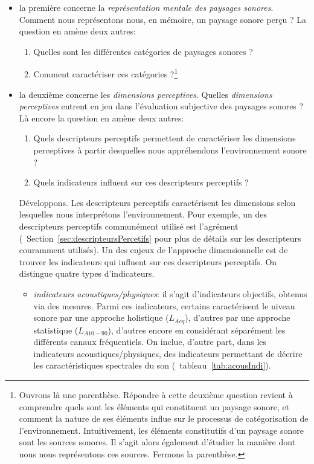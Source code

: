 \begin{itemize}
\item la première concerne la \emph{représentation mentale des paysages sonores}. Comment nous représentons nous, en mémoire, un paysage sonore perçu ? La question en amène deux autres:

\begin{enumerate}
\item Quelles sont les différentes catégories de paysages sonores ?
\item Comment caractériser ces catégories ?\footnote{Ouvrons là une parenthèse. Répondre à cette deuxième question revient à comprendre quels sont les éléments qui constituent un paysage sonore, et comment la nature de ses éléments influe sur le processus de catégorisation de l'environnement. Intuitivement, les éléments constitutifs d'un paysage sonore sont les sources sonores. Il s'agit alors également d'étudier la manière dont nous nous représentons ces sources. Fermons la parenthèse.}
\end{enumerate}

\item la deuxième concerne les \emph{dimensions perceptives}.  Quelles \emph{dimensions perceptives} entrent en jeu dans l'évaluation subjective des paysages sonores ?  Là encore la question en amène deux autres:
\begin{enumerate}
\item Quels descripteurs perceptifs permettent de caractériser les dimensions perceptives à partir desquelles nous appréhendons l'environnement sonore ?
\item Quels indicateurs influent sur ces descripteurs perceptifs ?
\end{enumerate}

Développons. Les descripteurs perceptifs caractérisent les dimensions selon lesquelles nous interprétons l'environnement. Pour exemple, un des descripteurs perceptifs communément utilisé est l'agrément (\cf~Section~\ref{sec:descripteursPercetifs} pour plus de détails sur les descripteurs couramment utilisés). 
Un des enjeux de l'approche dimensionnelle est de trouver les indicateurs qui influent sur ces descripteurs perceptifs. On distingue quatre types d'indicateurs.

\begin{itemize}
\item \emph{indicateurs acoustiques/physiques}: il s'agit d'indicateurs objectifs, obtenus via des mesures. Parmi ces indicateurs, certains caractérisent le niveau sonore par une approche holistique ($L_{Aeq}$), d'autres par une approche statistique ($L_{A10-90}$), d'autres encore en considérant séparément les différents canaux fréquentiels. On inclue, d'autre part, dans les indicateurs acoustiques/physiques, des indicateurs permettant de décrire les caractéristiques spectrales du son (\cf~tableau~\ref{tab:acousIndi}).


\end{itemize}
\end{itemize}
